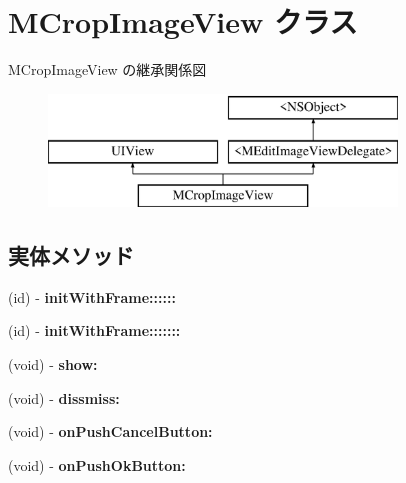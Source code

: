 \hypertarget{interface_m_crop_image_view}{}\section{M\+Crop\+Image\+View クラス}
\label{interface_m_crop_image_view}
M\+Crop\+Image\+View の継承関係図\begin{figure}[H]
\begin{center}
\leavevmode
\includegraphics[height=3.000000cm]{interface_m_crop_image_view}
\end{center}
\end{figure}
\subsection*{実体メソッド}
\begin{DoxyCompactItemize}
\item 
\hypertarget{interface_m_crop_image_view_a684899b85610c7f7f4eb2e481cacd26f}{}(id) -\/ {\bfseries init\+With\+Frame\+::::::}\label{interface_m_crop_image_view_a684899b85610c7f7f4eb2e481cacd26f}

\item 
\hypertarget{interface_m_crop_image_view_a8cc05804363fc182fef3e5ef8a5363da}{}(id) -\/ {\bfseries init\+With\+Frame\+:::::::}\label{interface_m_crop_image_view_a8cc05804363fc182fef3e5ef8a5363da}

\item 
\hypertarget{interface_m_crop_image_view_a6a867b9aa859553941c2b7b3d9ebd3cd}{}(void) -\/ {\bfseries show\+:}\label{interface_m_crop_image_view_a6a867b9aa859553941c2b7b3d9ebd3cd}

\item 
\hypertarget{interface_m_crop_image_view_a95f4453e4103ac8ec9d9c049d9be3f28}{}(void) -\/ {\bfseries dissmiss\+:}\label{interface_m_crop_image_view_a95f4453e4103ac8ec9d9c049d9be3f28}

\item 
\hypertarget{interface_m_crop_image_view_ad8f03f2db4e84a6fdaa4c4e3f5ff2533}{}(void) -\/ {\bfseries on\+Push\+Cancel\+Button\+:}\label{interface_m_crop_image_view_ad8f03f2db4e84a6fdaa4c4e3f5ff2533}

\item 
\hypertarget{interface_m_crop_image_view_a0388d6704b8d5065ed9450ee5d03665b}{}(void) -\/ {\bfseries on\+Push\+Ok\+Button\+:}\label{interface_m_crop_image_view_a0388d6704b8d5065ed9450ee5d03665b}

\end{DoxyCompactItemize}


